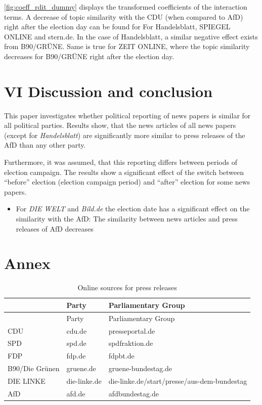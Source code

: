 \documentclass[
]{article}
\providecommand{\tightlist}{%
  \setlength{\itemsep}{0pt}\setlength{\parskip}{0pt}}
\begin{document}
\autoref{fig:coeff_rdit_dummy} displays the transformed coefficients of
the interaction terms. A decrease of topic similarity with the CDU (when
compared to AfD) right after the election day can be found for For
Handelsblatt, SPIEGEL ONLINE and stern.de. In the case of Handelsblatt,
a similar negative effect exists from B90/GRÜNE. Same is true for ZEIT
ONLINE, where the topic similarity decreases for B90/GRÜNE right after
the election day.

\hypertarget{vi-discussion-and-conclusion}{%
\section{VI Discussion and
conclusion}\label{vi-discussion-and-conclusion}}

This paper investigates whether political reporting of news papers is
similar for all political parties. Results show, that the news articles
of all news papers (except for \emph{Handelsblatt}) are significantly
more similar to press releases of the AfD than any other party.

Furthermore, it was assumed, that this reporting differs between periods
of election campaign. The results show a significant effect of the
switch between ``before'' election (election campaign period) and
``after'' election for some news papers.

\begin{itemize}
\tightlist
\item
  For \emph{DIE WELT} and \emph{Bild.de} the election date has a
  significant effect on the similarity with the AfD: The similarity
  between news articles and press releases of AfD decreases
\end{itemize}

\newpage

\hypertarget{annex}{%
\section{Annex}\label{annex}}

\begin{longtable}[]{@{}lll@{}}
\caption{Online sources for press releases
\label{table:press_releases_sources}}\tabularnewline
\toprule
& Party & Parliamentary Group \\
\midrule
\endfirsthead
\toprule
& Party & Parliamentary Group \\
\midrule
\endhead
CDU & cdu.de & presseportal.de \\
SPD & spd.de & spdfraktion.de \\
FDP & fdp.de & fdpbt.de \\
B90/Die Grünen & gruene.de & gruene-bundestag.de \\
DIE LINKE & die-linke.de &
die-linke.de/start/presse/aus-dem-bundestag \\
AfD & afd.de & afdbundestag.de \\
\bottomrule
\end{longtable}
\end{document}
